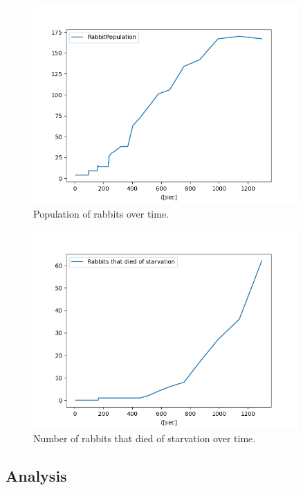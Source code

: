 \begin{figure}[H]
    \centering
    \includegraphics[width=0.9\textwidth]{Images/SimulationResults/Simulation_7_RabbitPopulation.png}
    \caption{Population of rabbits over time.}
    \label{fig:simulation1RabbitPopulation}
\end{figure}

\begin{figure}[H]
    \centering
    \includegraphics[width=0.9\textwidth]{Images/SimulationResults/Simulation_7_Rabbits that died of starvation.png}
    \caption{Number of rabbits that died of starvation over time.}
    \label{fig:simulation1RabbitsDiedOfHunger}
\end{figure}

\subsection{Analysis}
